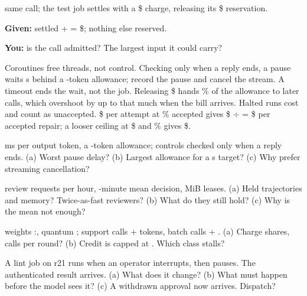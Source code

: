 \documentclass{studysheet}
\begin{document}
\begin{leftcol}
\vspace{10pt}
\begin{practicebox}
\assumed{} same call; the test job settles with a \$ charge, releasing its \$ reservation.\par\vspace{4pt}
\textbf{Given:} settled  +  = \$; nothing else reserved.\par
\textbf{You:} is the call admitted? The largest input it could carry?\par\vspace{30pt}
\end{practicebox}
\end{leftcol}%
\begin{rightcol}
%
  {Coroutines free threads, not control. Checking only when a reply ends, a pause waits  s behind
   a -token allowance; record the pause and cancel the stream.}{}
%
  {A timeout ends the wait, not the job. Releasing \$ hands \% of the allowance
   to later calls, which overshoot by up to that much when the bill arrives.}{}
%
  {Halted runs cost and count as unaccepted. \assumed{} \$ per attempt at \%
   accepted gives \$ $\div$  = \$ per accepted repair; a looser
   ceiling at \$ and \% gives \$.}{}

\vspace{2pt}
\begin{qs}
\item \assumed{}  ms per output token, a -token allowance; controls checked only when a reply
  ends. (a) Worst pause delay? (b) Largest allowance for a  s target? (c) Why prefer streaming
  cancellation?
\item \assumed{}  review requests per hour, -minute mean decision,  MiB leases.
  (a) Held trajectories and memory? Twice-as-fast reviewers? (b) What do they still hold? (c) Why
  is the mean not enough?
\item \assumed{} weights :, quantum ; support calls  +  tokens,
  batch calls  + . (a) Charge shares, calls per round? (b) Credit is capped at
  . Which class stalls?
\item A lint job on r21 runs when an operator interrupts, then pauses. The authenticated result arrives.
  (a) What does it change? (b) What must happen before the model sees it? (c) A withdrawn approval
  now arrives. Dispatch?
\end{qs}
\end{rightcol}
\end{document}
